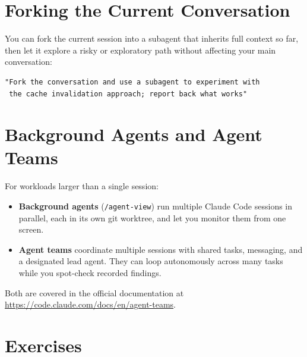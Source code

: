 \section{Forking the Current Conversation}
\label{sec:agent-fork}


You can fork the current session into a subagent that inherits full context so
far, then let it explore a risky or exploratory path without affecting your
main conversation:

\begin{lstlisting}[caption={Forking a session for an exploratory investigation}]
"Fork the conversation and use a subagent to experiment with
 the cache invalidation approach; report back what works"
\end{lstlisting}

\section{Background Agents and Agent Teams}
\label{sec:background-agents}


For workloads larger than a single session:

\begin{itemize}
  \item \textbf{Background agents} (\texttt{/agent-view}) run multiple
        Claude Code sessions in parallel, each in its own git worktree, and
        let you monitor them from one screen.
  \item \textbf{Agent teams} coordinate multiple sessions with shared tasks,
        messaging, and a designated lead agent. They can loop autonomously
        across many tasks while you spot-check recorded findings.
\end{itemize}

Both are covered in the official documentation at
\url{https://code.claude.com/docs/en/agent-teams}.

\section{Exercises}
\label{sec:agent-exercises}

